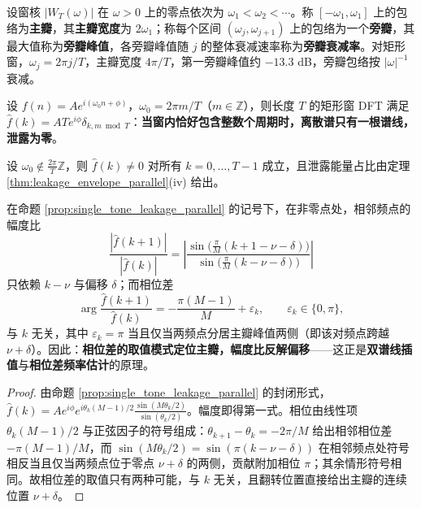 \begin{definition}[主瓣与旁瓣]\label{def:mainlobe_sidelobe_parallel}
设窗核 $|W_T(\omega)|$ 在 $\omega>0$ 上的零点依次为 $\omega_1<\omega_2<\cdots$。称 $[-\omega_1,\omega_1]$ 上的包络为\textbf{主瓣}，其\textbf{主瓣宽度}为 $2\omega_1$；称每个区间 $(\omega_j,\omega_{j+1})$ 上的包络为一个\textbf{旁瓣}，其最大值称为\textbf{旁瓣峰值}，各旁瓣峰值随 $j$ 的整体衰减速率称为\textbf{旁瓣衰减率}。对矩形窗，$\omega_j=2\pi j/T$，主瓣宽度 $4\pi/T$，第一旁瓣峰值约 $-13.3$ dB，旁瓣包络按 $|\omega|^{-1}$ 衰减。
\end{definition}

\begin{corollary}[整数窗口无泄露]\label{cor:integer_window_no_leakage}
设 $f(n)=Ae^{i(\omega_0 n+\phi)}$，$\omega_0=2\pi m/T$（$m\in\mathbb{Z}$），则长度 $T$ 的矩形窗 DFT 满足 $\hat f(k)=ATe^{i\phi}\delta_{k,m\bmod T}$：\textbf{当窗内恰好包含整数个周期时，离散谱只有一根谱线，泄露为零}。
\end{corollary}

\begin{corollary}[非整数窗口必有泄露]\label{cor:noninteger_window_leakage}
设 $\omega_0\notin\frac{2\pi}{T}\mathbb{Z}$，则 $\hat f(k)\ne0$ 对所有 $k=0,\dots,T-1$ 成立，且泄露能量占比由定理 \ref{thm:leakage_envelope_parallel}(iv) 给出。
\end{corollary}

\begin{proposition}[泄露的相位刻画]\label{prop:leakage_phase_characterisation}
在命题 \ref{prop:single_tone_leakage_parallel} 的记号下，在非零点处，相邻频点的幅度比
\[
\frac{|\hat f(k+1)|}{|\hat f(k)|}=\left|\frac{\sin\big(\tfrac{\pi}{M}(k+1-\nu-\delta)\big)}{\sin\big(\tfrac{\pi}{M}(k-\nu-\delta)\big)}\right|
\]
只依赖 $k-\nu$ 与偏移 $\delta$；而相位差
\[
\arg\frac{\hat f(k+1)}{\hat f(k)}=-\frac{\pi(M-1)}{M}+\varepsilon_k,\qquad
\varepsilon_k\in\{0,\pi\},
\]
与 $k$ 无关，其中 $\varepsilon_k=\pi$ 当且仅当两频点分居主瓣峰值两侧（即该对频点跨越 $\nu+\delta$）。因此：\textbf{相位差的取值模式定位主瓣，幅度比反解偏移}——这正是\textbf{双谱线插值}与\textbf{相位差频率估计}的原理。
\end{proposition}

\begin{proof}
由命题 \ref{prop:single_tone_leakage_parallel} 的封闭形式，
$\hat f(k)=Ae^{i\phi}e^{i\theta_k(M-1)/2}\frac{\sin(M\theta_k/2)}{\sin(\theta_k/2)}$。幅度即得第一式。相位由线性项 $\theta_k(M-1)/2$ 与正弦因子的符号组成：$\theta_{k+1}-\theta_k=-2\pi/M$ 给出相邻相位差 $-\pi(M-1)/M$，而 $\sin(M\theta_k/2)=\sin(\pi(k-\nu-\delta))$ 在相邻频点处符号相反当且仅当两频点位于零点 $\nu+\delta$ 的两侧，贡献附加相位 $\pi$；其余情形符号相同。故相位差的取值只有两种可能，与 $k$ 无关，且翻转位置直接给出主瓣的连续位置 $\nu+\delta$。
\end{proof}

